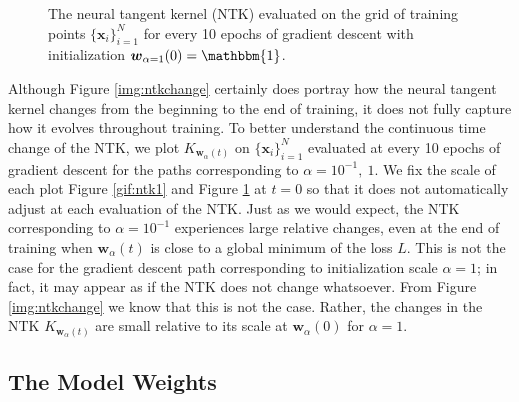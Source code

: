 \documentclass{article}
\begin{document}
\begin{figure}[H]
\caption{The neural tangent kernel (NTK) evaluated on the grid of training points $\{ \boldsymbol{x}_i \}_{i=1}^N$ for every 10 epochs of gradient descent with initialization $\boldsymbol{w}_{\alpha = 1}(0) = \mathbbm{1}$.}\label{gif:ntk2}
\end{figure}

Although Figure \ref{img:ntkchange} certainly does portray how the neural tangent kernel changes from the beginning to the end of training, it does not fully capture how it evolves throughout training. To better understand the continuous time change of the NTK, we plot $K_{\boldsymbol{w}_{\alpha}(t)}$ on $\{ \boldsymbol{x}_i \}_{i=1}^N$ evaluated at every 10 epochs of gradient descent for the paths corresponding to $\alpha = 10^{-1}, \ 1$. We fix the scale of each plot Figure \ref{gif:ntk1} and Figure \ref{gif:ntk2} at $t = 0$ so that it does not automatically adjust at each evaluation of the NTK. Just as we would expect, the NTK corresponding to $\alpha = 10^{-1}$ experiences large relative changes, even at the end of training when $\boldsymbol{w}_{\alpha}(t)$ is close to a global minimum of the loss $L$. This is not the case for the gradient descent path corresponding to initialization scale $\alpha = 1$; in fact, it may appear as if the NTK does not change whatsoever. From Figure \ref{img:ntkchange} we know that this is not the case. Rather, the changes in the NTK $K_{\boldsymbol{w}_{\alpha}(t)}$ are small relative to its scale at $\boldsymbol{w}_{\alpha}(0)$ for $\alpha = 1$.

\subsection{The Model Weights}
\end{document}
